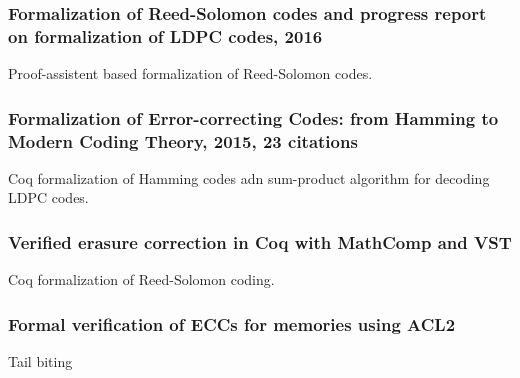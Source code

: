 \documentclass{article}
\begin{document}
\subsubsection{Formalization of Reed-Solomon codes and progress report on formalization of LDPC codes, 2016}

Proof-assistent based formalization of Reed-Solomon codes.

\subsubsection{Formalization of Error-correcting Codes: from Hamming to Modern Coding Theory, 2015, 23 citations}

Coq formalization of Hamming codes adn sum-product algorithm for decoding LDPC codes.

\subsubsection{Verified erasure correction in Coq with MathComp and VST}

Coq formalization of Reed-Solomon coding.

\subsubsection{Formal verification of ECCs for memories using ACL2}

Tail biting
\end{document}
